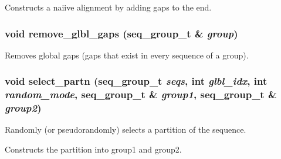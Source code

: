 Constructs a naiive alignment by adding gaps to the end. 
\subsubsection{\setlength{\rightskip}{0pt plus 5cm}void remove\_\-glbl\_\-gaps (seq\_\-group\_\-t \& {\em group})}\label{bm__utils_8cpp_a2}


Removes global gaps (gaps that exist in every sequence of a group). 
\subsubsection{\setlength{\rightskip}{0pt plus 5cm}void select\_\-partn (seq\_\-group\_\-t {\em seqs}, int {\em glbl\_\-idx}, int {\em random\_\-mode}, seq\_\-group\_\-t \& {\em group1}, seq\_\-group\_\-t \& {\em group2})}\label{bm__utils_8cpp_a1}


Randomly (or pseudorandomly) selects a partition of the sequence.

Constructs the partition into group1 and group2. 